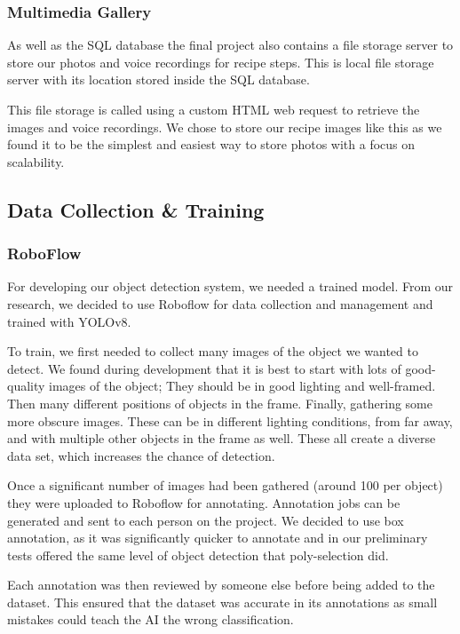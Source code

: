 \documentclass{article}
\begin{document}
\subsubsection{Multimedia Gallery}\label{multimediaGallery}
As well as the SQL database the final project also contains a file storage server to store our photos and voice recordings for recipe steps. This is local file storage server with its location stored inside the SQL database.

This file storage is called using a custom HTML web request to retrieve the images and voice recordings. We chose to store our recipe images like this as we found it to be the simplest and easiest way to store photos with a focus on scalability.

\subsection{Data Collection \& Training}
\subsubsection{RoboFlow}
For developing our object detection system, we needed a trained model. From our research, we decided to use Roboflow for data collection and management and trained with YOLOv8.

To train, we first needed to collect many images of the object we wanted to detect. We found during development that it is best to start with lots of good-quality images of the object; They should be in good lighting and well-framed. Then many different positions of objects in the frame. Finally, gathering some more obscure images. These can be in different lighting conditions, from far away, and with multiple other objects in the frame as well. These all create a diverse data set, which increases the chance of detection.

Once a significant number of images had been gathered (around 100 per object) they were uploaded to Roboflow for annotating. Annotation jobs can be generated and sent to each person on the project. We decided to use box annotation, as it was significantly quicker to annotate and in our preliminary tests offered the same level of object detection that poly-selection did.

Each annotation was then reviewed by someone else before being added to the dataset. This ensured that the dataset was accurate in its annotations as small mistakes could teach the AI the wrong classification.
\end{document}
